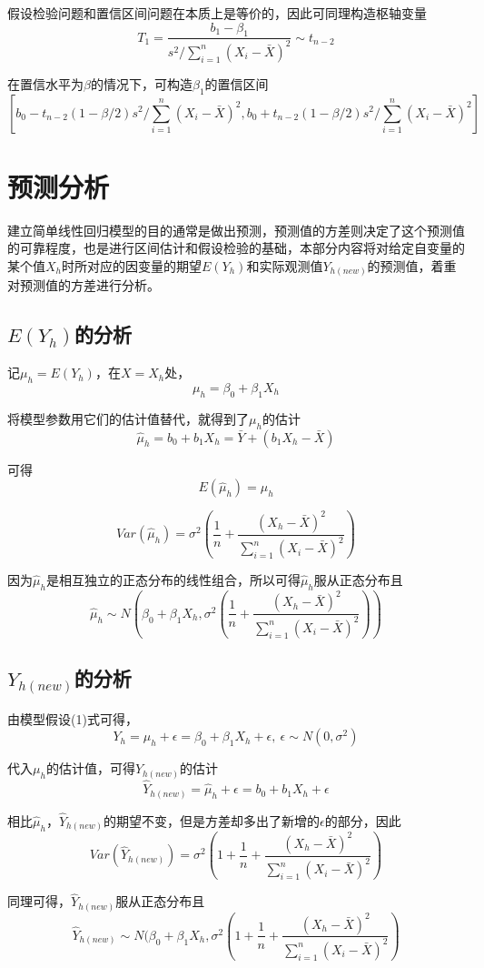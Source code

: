 \documentclass[UTF8]{ctexart}
\begin{document}
假设检验问题和置信区间问题在本质上是等价的，因此可同理构造枢轴变量
$$T_1=\frac{b_1-\beta_1}{s^2/\sum_{i=1}^n(X_i-\bar{X})^2}\sim t_{n-2}$$

在置信水平为$\beta$的情况下，可构造$\beta_1$的置信区间
$$[b_0-t_{n-2}(1-\beta/2)s^2/\sum_{i=1}^n(X_i-\bar{X})^2,b_0+t_{n-2}(1-\beta/2)s^2/\sum_{i=1}^n(X_i-\bar{X})^2]$$

\section{预测分析}
建立简单线性回归模型的目的通常是做出预测，预测值的方差则决定了这个预测值的可靠程度，也是进行区间估计和假设检验的基础，本部分内容将对给定自变量的某个值$X_h$时所对应的因变量的期望$E(Y_h)$和实际观测值$Y_{h(new)}$的预测值，着重对预测值的方差进行分析。

\subsection{$E(Y_h)$的分析}
记$\mu_h=E(Y_h)$，在$X=X_h$处，
$$\mu_h=\beta_0+\beta_1X_h$$

将模型参数用它们的估计值替代，就得到了$\mu_h$的估计
$$\hat{\mu}_h=b_0+b_1X_h=\bar{Y}+(b_1X_h-\bar{X})$$

可得
$$E(\hat{\mu}_h)=\mu_h$$

$$Var(\hat{\mu}_h)=\sigma^2(\frac{1}{n}+\frac{(X_h-\bar{X})^2}{\sum_{i=1}^n(X_i-\bar{X})^2})$$

因为$\hat{\mu}_h$是相互独立的正态分布的线性组合，所以可得$\hat{\mu}_h$服从正态分布且
$$\hat{\mu}_h\sim N(\beta_0+\beta_1X_h,\sigma^2(\frac{1}{n}+\frac{(X_h-\bar{X})^2}{\sum_{i=1}^n(X_i-\bar{X})^2}))$$

\subsection{$Y_{h(new)}$的分析}
由模型假设(1)式可得，
$$Y_h=\mu_h+\epsilon=\beta_0+\beta_1X_h+\epsilon,\ \epsilon\sim N(0, \sigma^2)$$

代入$\mu_h$的估计值，可得$Y_{h(new)}$的估计
$$\hat{Y}_{h(new)}=\hat{\mu}_h+\epsilon=b_0+b_1X_h+\epsilon$$

相比$\hat{\mu}_h$，$\hat{Y}_{h(new)}$的期望不变，但是方差却多出了新增的$\epsilon$的部分，因此
$$Var(\hat{Y}_{h(new)})=\sigma^2(1+\frac{1}{n}+\frac{(X_h-\bar{X})^2}{\sum_{i=1}^n(X_i-\bar{X})^2})$$

同理可得，$\hat{Y}_{h(new)}$服从正态分布且
$$\hat{Y}_{h(new)}\sim N(\beta_0+\beta_1X_h, \sigma^2(1+\frac{1}{n}+\frac{(X_h-\bar{X})^2}{\sum_{i=1}^n(X_i-\bar{X})^2})$$
\end{document}
